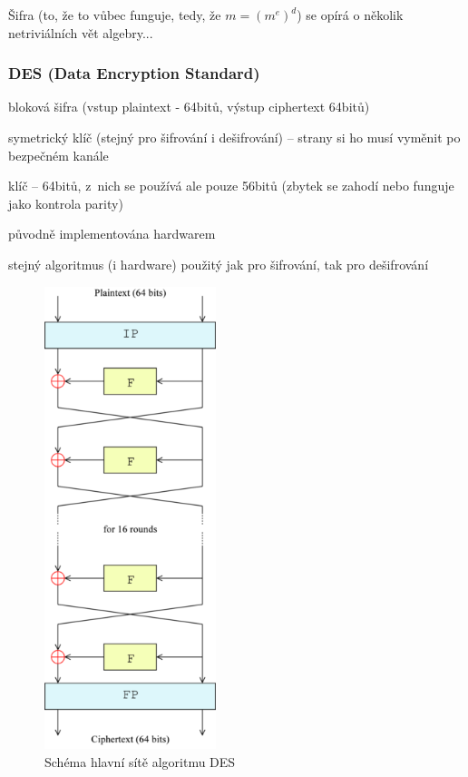 Šifra (to, že to vůbec funguje, tedy, že $m = (m^e)^d$) se opírá o několik netriviálních vět algebry...

\subsubsection*{DES (Data Encryption Standard)}
\begin{pitemize}
\item bloková šifra (vstup plaintext - 64bitů, výstup ciphertext 64bitů)
\item symetrický klíč (stejný pro šifrování i dešifrování) -- strany si ho musí vyměnit po bezpečném kanále
\item klíč -- 64bitů, z nich se používá ale pouze 56bitů (zbytek se zahodí nebo funguje jako kontrola parity)
\item původně implementována hardwarem
\item stejný algoritmus (i hardware) použitý jak pro šifrování, tak pro dešifrování
\end{pitemize}

\begin{figure}[ht]
  \begin{center}
    \includegraphics[width=5cm, angle=90]{informatika/siete_a_bezpecnost/obrazky/des-main-network.png}
    \caption{Schéma hlavní sítě algoritmu DES}
  \end{center}
\end{figure}

